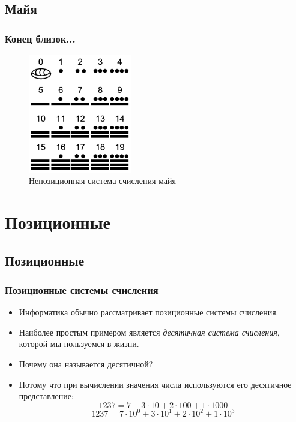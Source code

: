 \documentclass[compress,red]{beamer}
\begin{document}
\subsection{Майя}
\begin{frame}[fragile]
  \frametitle{Конец близок...}
  \begin{figure}
    \centerline{\includegraphics[width=0.4\textwidth]{images/maya.png}}
    \caption{Непозиционная система счисления майя}
  \end{figure}
\end{frame}

\section{Позиционные}
\subsection{Позиционные}
\begin{frame}[fragile]
  \frametitle{Позиционные системы счисления}
  \begin{itemize}
    \item Информатика обычно рассматривает позиционные системы счисления.
    \item Наиболее простым примером является \emph{десятичная система счисления}, которой мы пользуемся в жизни.
    \item Почему она называется десятичной?
    \item Потому что при вычислении значения числа используются его десятичное представление:
    $$
      1237 = 7 + 3\cdot 10 + 2\cdot 100 + 1\cdot 1000
    $$
    $$
      1237 = 7\cdot 10^0 + 3\cdot 10^1 + 2\cdot 10^2 + 1\cdot 10^3
    $$
  \end{itemize}
\end{frame}
\end{document}

